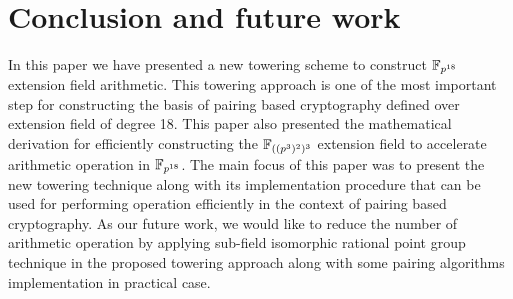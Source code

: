 \section{Conclusion and future work}
In this paper we have presented a new towering scheme to construct $\mathbb{F}_{p^{18}}$ extension field arithmetic. This towering approach is one of the most important step for constructing the basis of pairing based cryptography defined over extension field of degree 18. This paper also presented the mathematical derivation for efficiently constructing the $\mathbb{F}_{((p^3)^2)^3}$ extension field to accelerate arithmetic operation in $\mathbb{F}_{p^{18}}$. The main focus of this paper was to present the new towering technique along with its implementation procedure that can be used for performing operation efficiently in the context of pairing based cryptography. As our future work, we would like to reduce the number of arithmetic operation by applying sub-field isomorphic rational point group technique in the proposed towering approach along with some pairing algorithms implementation in practical case.
